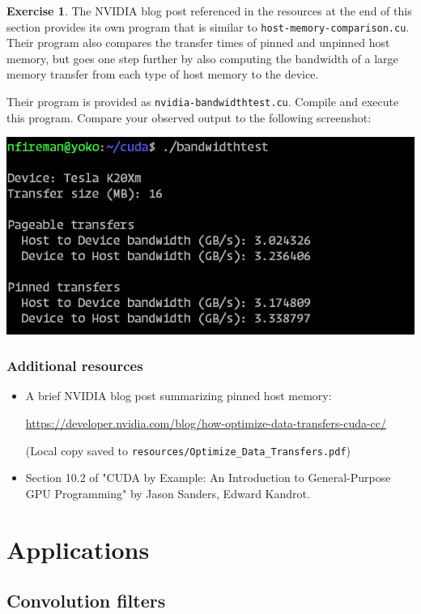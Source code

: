 \documentclass{article}
\newcommand{\resource}[1]{(Local copy saved to \texttt{#1})}
\theoremstyle{definition}
\newtheorem{exercise}{Exercise}
\begin{document}
\begin{exercise}
The NVIDIA blog post referenced in the resources at the end of this section provides its own program that is similar to \texttt{host-memory-comparison.cu}. Their program also compares the transfer times of pinned and unpinned host memory, but goes one step further by also computing the bandwidth of a large memory transfer from each type of host memory to the device.

Their program is provided as \texttt{nvidia-bandwidthtest.cu}. Compile and execute this program. Compare your observed output to the following screenshot:

\includegraphics[width=\textwidth]{images/bandwidth-test-output.png}
\end{exercise}

\subsubsection*{Additional resources}
\begin{itemize}
    \item A brief NVIDIA blog post summarizing pinned host memory:
    
    \url{https://developer.nvidia.com/blog/how-optimize-data-transfers-cuda-cc/}
    
    \resource{resources/Optimize\_Data\_Transfers.pdf}
    
    \item Section 10.2 of "CUDA by Example: An Introduction to General-Purpose GPU Programming" by Jason Sanders, Edward Kandrot.
\end{itemize}

\section{Applications}
\label{sec/applications}
\subsection{Convolution filters}
\end{document}

